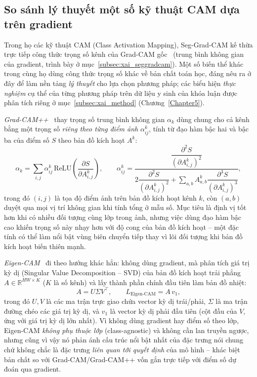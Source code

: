 \subsection{So sánh lý thuyết một số kỹ thuật CAM dựa trên gradient}
\label{subsec:xai_cam_compare}
Trong họ các kỹ thuật CAM (Class Activation Mapping), Seg-Grad-CAM kế thừa trực tiếp công thức trọng số kênh của Grad-CAM gốc~\cite{selvaraju2017gradcam} (trung bình không gian của gradient, trình bày ở mục~\ref{subsec:xai_seggradcam}). Một số biến thể khác trong cùng họ dùng công thức trọng số khác về bản chất toán học, đáng nêu ra ở đây để làm nền tảng \emph{lý thuyết} cho lựa chọn phương pháp; các biểu hiện \emph{thực nghiệm} cụ thể của từng phương pháp trên dữ liệu y sinh của khóa luận được phân tích riêng ở mục~\ref{subsec:xai_method} (Chương~\ref{Chapter5}).

\emph{Grad-CAM++}~\cite{chattopadhay2018gradcampp} thay trọng số trung bình không gian $\alpha_k$ dùng chung cho cả kênh bằng một trọng số \emph{riêng theo từng điểm ảnh} $\alpha_{ij}^{k}$, tính từ đạo hàm bậc hai và bậc ba của điểm số $S$ theo bản đồ kích hoạt $A^k$:
\begin{equation}
    \alpha_k = \sum_{i,j} \alpha_{ij}^{k}\,\mathrm{ReLU}\!\left(\frac{\partial S}{\partial A^k_{i,j}}\right),
    \qquad
    \alpha_{ij}^{k} = \frac{\dfrac{\partial^2 S}{(\partial A^k_{i,j})^2}}{2\dfrac{\partial^2 S}{(\partial A^k_{i,j})^2} + \sum\limits_{a,b} A^k_{a,b}\dfrac{\partial^3 S}{(\partial A^k_{i,j})^3}},
\end{equation}
trong đó $(i,j)$ là tọa độ điểm ảnh trên bản đồ kích hoạt kênh $k$, còn $(a,b)$ duyệt qua mọi vị trí không gian khi tính tổng ở mẫu số. Mục tiêu là định vị tốt hơn khi có nhiều đối tượng cùng lớp trong ảnh, nhưng việc dùng đạo hàm bậc cao khiến trọng số này nhạy hơn với độ cong của bản đồ kích hoạt -- một đặc tính có thể làm nổi bật vùng biên chuyển tiếp thay vì lõi đối tượng khi bản đồ kích hoạt biến thiên mạnh.

\emph{Eigen-CAM}~\cite{muhammad2020eigencam} đi theo hướng khác hẳn: không dùng gradient, mà phân tích giá trị kỳ dị (Singular Value Decomposition -- SVD) của bản đồ kích hoạt trải phẳng $A\in\mathbb{R}^{HW\times K}$ ($K$ là số kênh) và lấy thành phần chính đầu tiên làm bản đồ nhiệt:
\begin{equation}
    A = U\Sigma V^\top, \qquad L_{\text{Eigen-CAM}} = A\,v_1,
\end{equation}
trong đó $U, V$ là các ma trận trực giao chứa vector kỳ dị trái/phải, $\Sigma$ là ma trận đường chéo các giá trị kỳ dị, và $v_1$ là vector kỳ dị phải đầu tiên (cột đầu của $V$, ứng với giá trị kỳ dị lớn nhất). Vì không dùng gradient hay điểm số theo lớp, Eigen-CAM \emph{không phụ thuộc lớp} (class-agnostic) và không cần lan truyền ngược, nhưng cũng vì vậy nó phản ánh cấu trúc nổi bật nhất của đặc trưng nói chung chứ không chắc là đặc trưng \emph{liên quan tới quyết định} của mô hình -- khác biệt bản chất so với Grad-CAM/Grad-CAM++ vốn gắn trực tiếp với điểm số dự đoán qua gradient.

